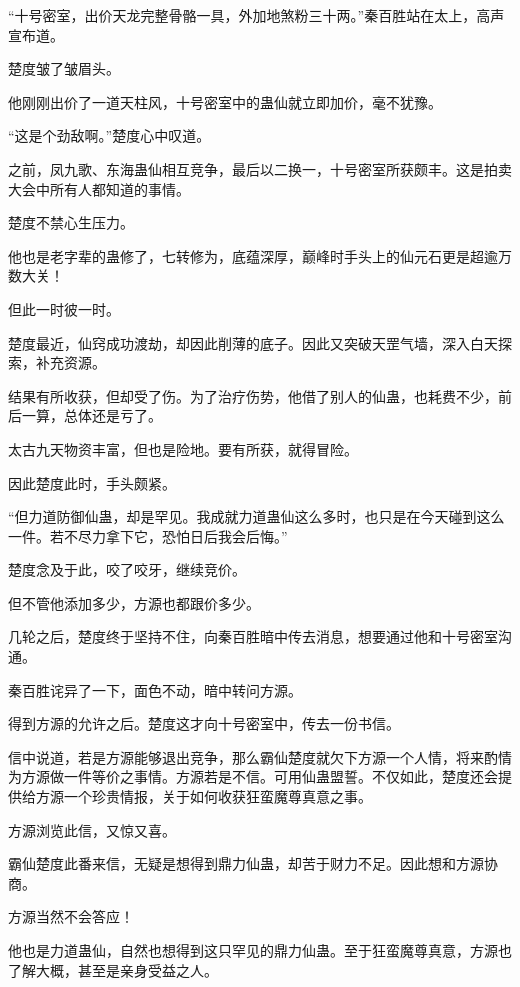 
\begin{this_body}



“十号密室，出价天龙完整骨骼一具，外加地煞粉三十两。”秦百胜站在太上，高声宣布道。

楚度皱了皱眉头。

他刚刚出价了一道天柱风，十号密室中的蛊仙就立即加价，毫不犹豫。

“这是个劲敌啊。”楚度心中叹道。

之前，凤九歌、东海蛊仙相互竞争，最后以二换一，十号密室所获颇丰。这是拍卖大会中所有人都知道的事情。

楚度不禁心生压力。

他也是老字辈的蛊修了，七转修为，底蕴深厚，巅峰时手头上的仙元石更是超逾万数大关！

但此一时彼一时。

楚度最近，仙窍成功渡劫，却因此削薄的底子。因此又突破天罡气墙，深入白天探索，补充资源。

结果有所收获，但却受了伤。为了治疗伤势，他借了别人的仙蛊，也耗费不少，前后一算，总体还是亏了。

太古九天物资丰富，但也是险地。要有所获，就得冒险。

因此楚度此时，手头颇紧。

“但力道防御仙蛊，却是罕见。我成就力道蛊仙这么多时，也只是在今天碰到这么一件。若不尽力拿下它，恐怕日后我会后悔。”

楚度念及于此，咬了咬牙，继续竞价。

但不管他添加多少，方源也都跟价多少。

几轮之后，楚度终于坚持不住，向秦百胜暗中传去消息，想要通过他和十号密室沟通。

秦百胜诧异了一下，面色不动，暗中转问方源。

得到方源的允许之后。楚度这才向十号密室中，传去一份书信。

信中说道，若是方源能够退出竞争，那么霸仙楚度就欠下方源一个人情，将来酌情为方源做一件等价之事情。方源若是不信。可用仙蛊盟誓。不仅如此，楚度还会提供给方源一个珍贵情报，关于如何收获狂蛮魔尊真意之事。

方源浏览此信，又惊又喜。

霸仙楚度此番来信，无疑是想得到鼎力仙蛊，却苦于财力不足。因此想和方源协商。

方源当然不会答应！

他也是力道蛊仙，自然也想得到这只罕见的鼎力仙蛊。至于狂蛮魔尊真意，方源也了解大概，甚至是亲身受益之人。


\end{this_body}
